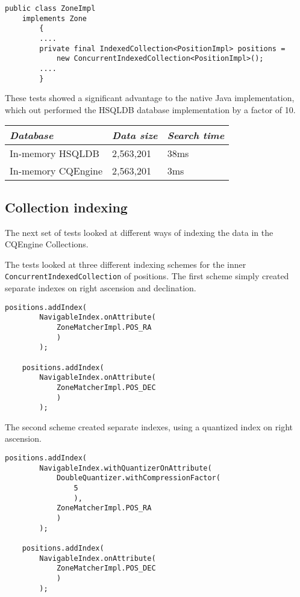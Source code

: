 \documentclass{article}
\newcommand{\hsqldb} {HSQLDB\xspace}
\newcommand{\cqengine} {CQEngine\xspace}
\begin{document}
\begin{lstlisting}[style=Java]
    public class ZoneImpl
    implements Zone
        {
        ....
        private final IndexedCollection<PositionImpl> positions =
            new ConcurrentIndexedCollection<PositionImpl>();
        ....
        }
\end{lstlisting}

These tests showed a significant advantage to the native Java implementation, which out performed the \hsqldb database implementation by a factor of 10.

\begin{table}[h]
\centering
\begin{tabular}{|l|l|l|}
\hline
\textit{Database} & \textit{Data size} & \textit{Search time} \\ \hline
In-memory \hsqldb & 2,563,201 & 38ms \\ \hline
In-memory \cqengine & 2,563,201 & 3ms \\ \hline
\end{tabular}
\end{table}

\subsection{Collection indexing}
\label{cqengine-indexing}

The next set of tests looked at different ways of indexing the data in the \cqengine Collections.

The tests looked at three different indexing schemes for the inner \texttt{ConcurrentIndexedCollection} of positions. The first scheme simply created separate indexes on right ascension and declination.

\begin{lstlisting}[style=Java]
    positions.addIndex(
        NavigableIndex.onAttribute(
            ZoneMatcherImpl.POS_RA
            )
        );

    positions.addIndex(
        NavigableIndex.onAttribute(
            ZoneMatcherImpl.POS_DEC
            )
        );
\end{lstlisting}

The second scheme created separate indexes, using a quantized index on right ascension.

\begin{lstlisting}[style=Java]
    positions.addIndex(
        NavigableIndex.withQuantizerOnAttribute(
            DoubleQuantizer.withCompressionFactor(
                5
                ),
            ZoneMatcherImpl.POS_RA
            )
        );

    positions.addIndex(
        NavigableIndex.onAttribute(
            ZoneMatcherImpl.POS_DEC
            )
        );
\end{lstlisting}
\end{document}
